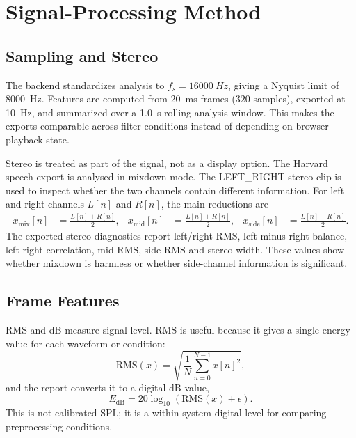 \documentclass[11pt,a4paper]{article}
\begin{document}
\section{Signal-Processing Method}

\subsection{Sampling and Stereo}

The backend standardizes analysis to $f_s=\SI{16000}{Hz}$, giving a Nyquist limit of \SI{8000}{Hz}. Features are computed from \SI{20}{ms} frames ($320$ samples), exported at \SI{10}{Hz}, and summarized over a \SI{1.0}{s} rolling analysis window. This makes the exports comparable across filter conditions instead of depending on browser playback state.

Stereo is treated as part of the signal, not as a display option. The Harvard speech export is analysed in mixdown mode. The LEFT\_RIGHT stereo clip is used to inspect whether the two channels contain different information. For left and right channels $L[n]$ and $R[n]$, the main reductions are
\begin{align}
    x_{\mathrm{mix}}[n] &= \frac{L[n]+R[n]}{2}, &
    x_{\mathrm{mid}}[n] &= \frac{L[n]+R[n]}{2}, &
    x_{\mathrm{side}}[n] &= \frac{L[n]-R[n]}{2}.
\end{align}
The exported stereo diagnostics report left/right RMS, left-minus-right balance, left-right correlation, mid RMS, side RMS and stereo width. These values show whether mixdown is harmless or whether side-channel information is significant.

\subsection{Frame Features}

RMS and dB measure signal level. RMS is useful because it gives a single energy value for each waveform or condition:
\begin{equation}
    \mathrm{RMS}(x) = \sqrt{\frac{1}{N}\sum_{n=0}^{N-1}x[n]^2},
\end{equation}
and the report converts it to a digital dB value,
\begin{equation}
    E_{\mathrm{dB}} = 20\log_{10}(\mathrm{RMS}(x)+\epsilon).
\end{equation}
This is not calibrated SPL; it is a within-system digital level for comparing preprocessing conditions.
\end{document}
